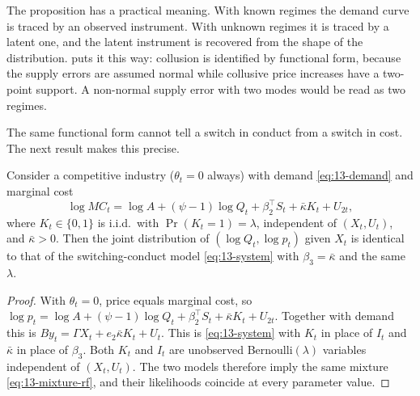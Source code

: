 The proposition has a practical meaning. With known regimes the demand curve is traced by an observed instrument.
With unknown regimes it is traced by a latent one, and the latent instrument is recovered from the shape of the
distribution.  puts it this way: collusion is identified by functional form, because the
supply errors are assumed normal while collusive price increases have a two-point support. A non-normal supply error
with two modes would be read as two regimes.

The same functional form cannot tell a switch in conduct from a switch in cost. The next result makes this precise.

\begin{proposition}\label{prop:13-obs-equiv}
Consider a competitive industry ($\theta_t = 0$ always) with demand \eqref{eq:13-demand} and marginal cost
\begin{equation*}
  \log MC_t = \log A + (\psi - 1)\log Q_t + \beta_2^\top S_t + \bar\kappa K_t + U_{2t},
\end{equation*}
where $K_t \in \{0,1\}$ is i.i.d.\ with $\Pr(K_t = 1) = \lambda$, independent of $(X_t, U_t)$, and $\bar\kappa > 0$.
Then the joint distribution of $(\log Q_t, \log p_t)$ given $X_t$ is identical to that of the switching-conduct
model \eqref{eq:13-system} with $\beta_3 = \bar\kappa$ and the same $\lambda$.
\end{proposition}

\begin{proof}
With $\theta_t = 0$, price equals marginal cost, so
$\log p_t = \log A + (\psi - 1)\log Q_t + \beta_2^\top S_t + \bar\kappa K_t + U_{2t}$. Together with demand this is
$By_t = \Gamma X_t + e_2\bar\kappa K_t + U_t$. This is \eqref{eq:13-system} with $K_t$ in place of $I_t$ and
$\bar\kappa$ in place of $\beta_3$. Both $K_t$ and $I_t$ are unobserved Bernoulli$(\lambda)$ variables independent of
$(X_t, U_t)$. The two models therefore imply the same mixture \eqref{eq:13-mixture-rf}, and their likelihoods
coincide at every parameter value.
\end{proof}


